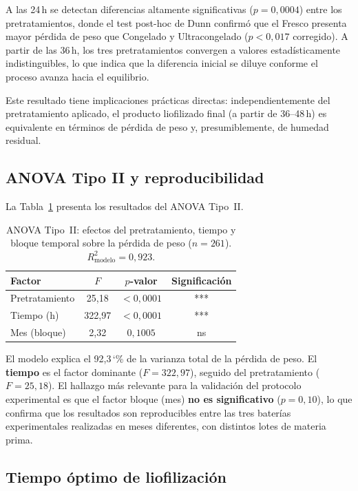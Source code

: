 \documentclass[12pt, a4paper]{article}
\newcommand{\pct}{\char`\%}
\begin{document}
A las 24\,h se detectan diferencias altamente significativas ($p = 0{,}0004$) entre los pretratamientos, donde el test post-hoc de Dunn confirmó que el Fresco presenta mayor pérdida de peso que Congelado y Ultracongelado ($p < 0{,}017$ corregido). A partir de las 36\,h, los tres pretratamientos convergen a valores estadísticamente indistinguibles, lo que indica que la diferencia inicial se diluye conforme el proceso avanza hacia el equilibrio.

Este resultado tiene implicaciones prácticas directas: independientemente del pretratamiento aplicado, el producto liofilizado final (a partir de 36--48\,h) es equivalente en términos de pérdida de peso y, presumiblemente, de humedad residual.

\subsection{ANOVA Tipo II y reproducibilidad}

La Tabla~\ref{tab:anova} presenta los resultados del ANOVA Tipo~II.

\begin{table}[H]
\centering
\caption{ANOVA Tipo~II: efectos del pretratamiento, tiempo y bloque temporal sobre la pérdida de peso ($n = 261$). $R^2_\text{modelo} = 0{,}923$.}
\label{tab:anova}
\begin{tabular}{@{}lccc@{}}
\toprule
\textbf{Factor} & $F$ & $p$\textbf{-valor} & \textbf{Significación} \\
\midrule
Pretratamiento & 25,18  & $< 0{,}0001$ & *** \\
Tiempo (h)     & 322,97 & $< 0{,}0001$ & *** \\
Mes (bloque)   & 2,32   & $0{,}1005$   & ns  \\
\bottomrule
\end{tabular}
\end{table}

El modelo explica el 92{,}3\,\pct{} de la varianza total de la pérdida de peso. El \textbf{tiempo} es el factor dominante ($F = 322{,}97$), seguido del pretratamiento ($F = 25{,}18$). El hallazgo más relevante para la validación del protocolo experimental es que el factor bloque (mes) \textbf{no es significativo} ($p = 0{,}10$), lo que confirma que los resultados son reproducibles entre las tres baterías experimentales realizadas en meses diferentes, con distintos lotes de materia prima.

\subsection{Tiempo óptimo de liofilización}
\end{document}
